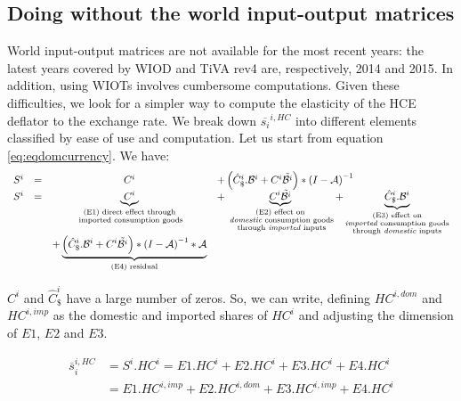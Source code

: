 \documentclass[12pt,a4paper]{paper}
\begin{document}
\subsection{Doing without the world input-output matrices}
World input-output matrices are not available for the most recent years: the latest years covered by WIOD and TiVA rev4 are, respectively, 2014 and 2015. 
In addition, using WIOTs involves cumbersome computations.
Given these difficulties, we look for a simpler way to compute the elasticity of the HCE deflator to the exchange rate.
We break down $\overline{s_{i}}^{i,HC}$ into different elements classified by ease of use and computation.
Let us start from equation \ref{eq:eqdomcurrency}.
We have:
\begin{equation}
\begin{array}{lccl}
	S^ i&=&C^i	&+ \left(\hat{C}^i_\$.{\cal B}^i+{C^i}{\tilde{{\cal B}^i}}\right)*{{(I-{\cal A})}^{-1}} \\
	S^i &=&\underbrace{C^i}_{\substack{\text{(E1) direct effect through} \\ \text{ imported consumption goods}}}&+ \underbrace{{C^i}{\tilde{{\cal B}^i}}}_{\substack{\text{(E2) effect on} \\ \text{ \emph{domestic} consumption goods} \\ \text{ through \emph{imported} inputs}}}  + \underbrace{\hat{C}^i_\$.{\cal B}^i}_{\substack{\text{(E3)  effect on} \\ \text{\emph{imported} consumption goods} \\ \text{through \emph{domestic} inputs}}} \\ &&+\underbrace {\left( \hat{C}^i_\$.{\cal B}^i + {C^i}{\tilde{{\cal B}^i}}\right)*{{(I-{\cal A})}^{-1}}*{\cal A}}_{\text{(E4) residual}} \\
\end{array}
\label{eq:decomp}
\end{equation}


$C^i$ and $\hat{C}^i_\$$ have a large number of zeros. So, we can write, defining $HC^{i,dom}$ and $HC^{i,imp}$ as the domestic and imported shares of $HC^i$ and adjusting the dimension of $E1$, $E2$ and $E3$.

\begin{equation}
\begin{array}{lccl}
\overline{s}_{i}^{i,HC}&=S^i.HC^i=E1.HC^i+E2.HC^i+E3.HC^i+E4.HC^i \\
&=E1.HC^{i,imp}+E2.HC^{i,dom}+E3.HC^{i,imp}+E4.HC^i
 \end{array} 
 \label{eq:eqtoto}
 \end{equation}
 
\end{document}
